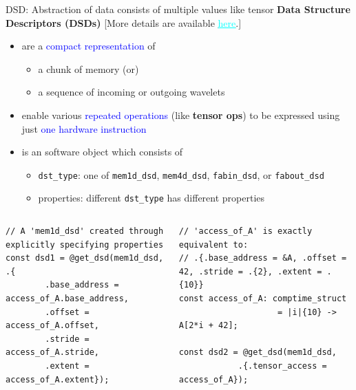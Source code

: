 \documentclass[dvipdfmx, 11pt, aspectratio=169]{beamer}   %
\newcommand{\ulhref}[2]{\href{#1}{\textcolor{cyan}{\uline{#2}}}}
\begin{document}
\begin{frame}[fragile]{DSD: Abstraction of data consists of multiple values like tensor}
\textbf{Data Structure Descriptors (DSDs)}      [More details are available \ulhref{https://sdk.cerebras.net/csl/language/dsds\#data-structure-descriptors}{here}.]
\begin{itemize}
    \item are a \textcolor{blue}{compact representation} of 
    \begin{itemize}
        \item a chunk of memory (or)
        \item a sequence of incoming or outgoing wavelets
    \end{itemize}
    \item enable various \textcolor{blue}{repeated operations} (like \textbf{tensor ops}) to be expressed using just \textcolor{blue}{one hardware instruction}
    \item is an software object which consists of
    \begin{itemize}
        \item \lstinline|dst_type|: one of \lstinline|mem1d_dsd|, \lstinline|mem4d_dsd|, \lstinline|fabin_dsd|, or \lstinline|fabout_dsd|
        \item properties: different \lstinline|dst_type| has different properties
    \end{itemize}
\end{itemize}
\begin{columns}
\begin{lstlisting}[language=CSL, basicstyle=\ttfamily\tiny]
// A 'mem1d_dsd' created through explicitly specifying properties
const dsd1 = @get_dsd(mem1d_dsd, .{
        .base_address = access_of_A.base_address,
        .offset = access_of_A.offset,
        .stride = access_of_A.stride,
        .extent = access_of_A.extent});
\end{lstlisting}
\begin{lstlisting}[language=CSL, basicstyle=\ttfamily\tiny]
// 'access_of_A' is exactly equivalent to: 
// .{.base_address = &A, .offset = 42, .stride = .{2}, .extent = .{10}}
const access_of_A: comptime_struct 
                    = |i|{10} -> A[2*i + 42];

const dsd2 = @get_dsd(mem1d_dsd, 
            .{.tensor_access = access_of_A});
\end{lstlisting}
\end{columns}
\end{frame}
\end{document}
